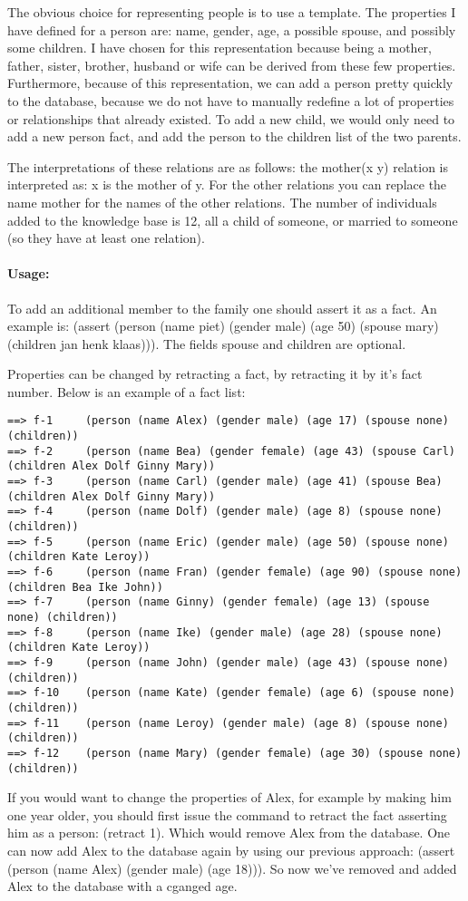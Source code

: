\documentclass[a4paper]{article}
\begin{document}
The obvious choice for representing people is to use a template. The properties I have defined for a person are: name, gender, age, a possible spouse, and possibly some children. I have chosen for this representation because being a mother, father, sister, brother, husband or wife can be derived from these few properties. Furthermore, because of this representation, we can add a person pretty quickly to the database, because we do not have to manually redefine a lot of properties or relationships that already existed. To add a new child, we would only need to add a new person fact, and add the person to the children list of the two parents. 

The interpretations of these relations are as follows: the mother(x y) relation is interpreted as: x is the mother of y. For the other relations you can replace the name mother for the names of the other relations. The number of individuals added to the knowledge base is 12, all a child of someone, or married to someone (so they have at least one relation). 

\paragraph{Usage:}
To add an additional member to the family one should assert it as a fact. An example is: (assert (person (name piet) (gender male) (age 50) (spouse mary) (children jan henk klaas))). The fields spouse and children are optional. 

Properties can be changed by retracting a fact, by retracting it by it's fact number. Below is an example of a fact list:
\begin{Verbatim}[fontsize=\scriptsize]
==> f-1     (person (name Alex) (gender male) (age 17) (spouse none) (children))
==> f-2     (person (name Bea) (gender female) (age 43) (spouse Carl) (children Alex Dolf Ginny Mary))
==> f-3     (person (name Carl) (gender male) (age 41) (spouse Bea) (children Alex Dolf Ginny Mary))
==> f-4     (person (name Dolf) (gender male) (age 8) (spouse none) (children))
==> f-5     (person (name Eric) (gender male) (age 50) (spouse none) (children Kate Leroy))
==> f-6     (person (name Fran) (gender female) (age 90) (spouse none) (children Bea Ike John))
==> f-7     (person (name Ginny) (gender female) (age 13) (spouse none) (children))
==> f-8     (person (name Ike) (gender male) (age 28) (spouse none) (children Kate Leroy))
==> f-9     (person (name John) (gender male) (age 43) (spouse none) (children))
==> f-10    (person (name Kate) (gender female) (age 6) (spouse none) (children))
==> f-11    (person (name Leroy) (gender male) (age 8) (spouse none) (children))
==> f-12    (person (name Mary) (gender female) (age 30) (spouse none) (children))
\end{Verbatim}
If you would want to change the properties of Alex, for example by making him one year older, you should first issue the command to retract the fact asserting him as a person: (retract 1). Which would remove Alex from the database. One can now add Alex to the database again by using our previous approach: (assert (person (name Alex) (gender male) (age 18))). So now we've removed and added Alex to the database with a cganged age.
\end{document}
